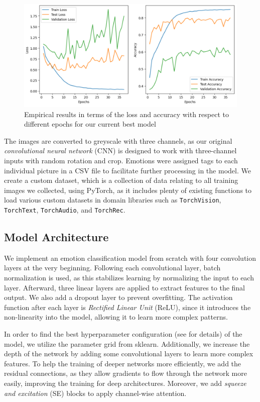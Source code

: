 \begin{figure}[ht]
  \centering
   \includegraphics[width=\linewidth]{output.png}
   \caption{Empirical results in terms of the loss and accuracy with respect to different epochs for our current best model} 
   \label{fig:result}
\end{figure}

The images are converted to greyscale with three channels, 
as our original \textit{convolutional neural network} (CNN) is designed to work with three-channel inputs with random rotation and crop. 
Emotions were assigned tags to each individual picture in a CSV file to facilitate further processing in the model.
We create a custom dataset, which is a collection of data relating to all training images we collected, 
using PyTorch, 
as it includes plenty of existing functions to load various custom datasets in domain libraries such as \texttt{TorchVision}, \texttt{TorchText}, \texttt{TorchAudio}, and \texttt{TorchRec}.

\subsection{Model Architecture}
We implement an emotion classification model from scratch with four convolution layers at the very beginning. 
Following each convolutional layer, 
batch normalization is used, 
as this stabilizes learning by normalizing the input to each layer. 
Afterward, three linear layers are applied to extract features to the final output. 
We also add a dropout layer to prevent overfitting. 
The activation function after each layer is \textit{Rectified Linear Unit} (ReLU), 
since it introduces the non-linearity into the model, 
allowing it to learn more complex patterns. 

In order to find the best hyperparameter configuration (see  for details) of the model, 
we utilize the parameter grid from sklearn.
Additionally, we increase the depth of the network by adding some convolutional layers to learn more complex features. 
To help the training of deeper networks more efficiently, 
we add the residual connections, 
as they allow gradients to flow through the network more easily, improving the training for deep architectures. 
Moreover, 
we add \textit{squeeze and excitation} (SE) blocks to apply channel-wise attention. 

